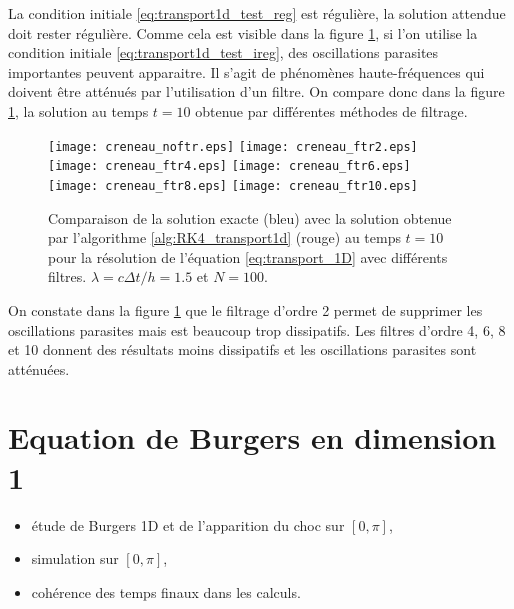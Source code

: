 La condition initiale \eqref{eq:transport1d_test_reg} est régulière, la solution attendue doit rester régulière. Comme cela est visible dans la figure \ref{fig:comp_ireg}, si l'on utilise la condition initiale \eqref{eq:transport1d_test_ireg}, des oscillations parasites importantes peuvent apparaitre. Il s'agit de phénomènes haute-fréquences qui doivent être atténués par l'utilisation d'un filtre. On compare donc dans la figure \ref{fig:comp_ireg}, la solution au temps $t=10$ obtenue par différentes méthodes de filtrage.
\begin{figure}[htbp]
\begin{center}
\texttt{[image: creneau\_noftr.eps]}
\texttt{[image: creneau\_ftr2.eps]}\\
\texttt{[image: creneau\_ftr4.eps]}
\texttt{[image: creneau\_ftr6.eps]}\\
\texttt{[image: creneau\_ftr8.eps]}
\texttt{[image: creneau\_ftr10.eps]}\\
\end{center}
\caption{Comparaison de la solution exacte (bleu) avec la solution obtenue par l'algorithme \ref{alg:RK4_transport1d} (rouge) au temps $t=10$ pour la résolution de l'équation \eqref{eq:transport_1D} avec différents filtres. $\lambda = c \Delta t / h = 1.5$ et $N=100$.}
\label{fig:comp_ireg}
\end{figure}
On constate dans la figure \ref{fig:comp_ireg} que le filtrage d'ordre 2 permet de supprimer les oscillations parasites mais est beaucoup trop dissipatifs. Les filtres d'ordre 4, 6, 8 et 10 donnent des résultats moins dissipatifs et les oscillations parasites sont atténuées.
























\section{Equation de Burgers en dimension 1}

\begin{itemize}
\item étude de Burgers 1D et de l'apparition du choc sur $[0,\pi]$,
\item simulation sur $[0,\pi]$,
\item cohérence des temps finaux dans les calculs.
\end{itemize}

